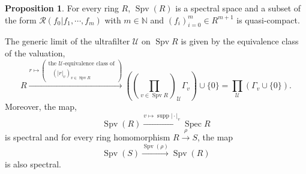 \documentclass[10pt]{article}
\numberwithin{equation}{section}
\theoremstyle{definition}
\newtheorem{proposition}{Proposition}[subsection]
\DeclareMathOperator{\supp}{supp}
\DeclareMathOperator{\Spec}{Spec}
\DeclareMathOperator{\Spv}{Spv}
\newcommand{\N}[0]{\mathbb{N}}
\newcommand{\U}[0]{\mathcal{U}}
\newcommand{\cR}[0]{\mathcal{R}}
\newcommand{\ab}[1]{\vert #1 \vert}
\begin{document}
\begin{proposition}
    \label{propostion_6_1}
    For every ring $R$, $\Spv(R)$ is a spectral space and a subset of the form $\cR(f_0|f_1,\cdots,f_m)$ with $m\in\N$ and $(f_i)_{i=0}^m\in R^{m+1}$ is quasi-compact.
    \par The generic limit of the ultrafilter $\U$ on $\Spv R$ is given by the equivalence class of the valuation,
    \begin{equation}
        R\stackrel{r\mapsto \left(\substack{\text{the $\U$-equivalence class of}\\\text{ $(\ab{r}_v)_{v\in\Spv R}$}}\right)}{\longrightarrow}\left(\left({\prod_{v\in\Spv R}}\right)_\U\Gamma_v\right)\cup\{0\}=\prod_\U(\Gamma_v\cup\{0\}).\label{proposition_6_1_1}
    \end{equation}
    Moreover, the map,
    \begin{equation*}
        \Spv(R)\stackrel{v\mapsto \supp\ab{\cdot}_v}{\longrightarrow}\Spec R
    \end{equation*}
    is spectral and for every ring homomorphism $R\stackrel{\rho}{\to}S$, the map
    \begin{equation*}
        \Spv(S)\stackrel{\Spv(\rho)}{\to}\Spv(R)
    \end{equation*}
    is also spectral.
\end{proposition}
\end{document}
